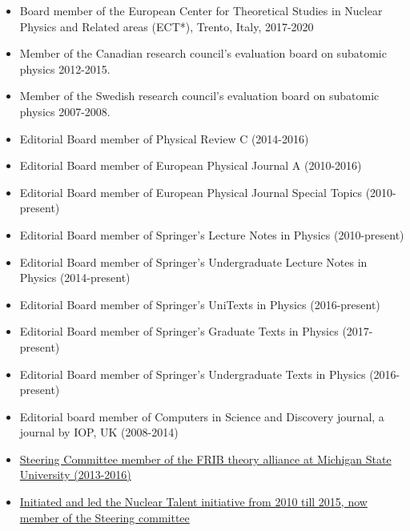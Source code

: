 \documentclass[11pt]{revtex4-1}
\begin{document}
\begin{itemize}

\item Board member of the European Center for Theoretical Studies in Nuclear Physics and Related areas (ECT*), Trento, Italy, 2017-2020


\item Member of the Canadian research council's evaluation board on subatomic physics 2012-2015.

\item Member of the Swedish research council's evaluation board on subatomic physics 2007-2008.

\item Editorial Board member of Physical Review C (2014-2016)

\item Editorial Board member of European Physical Journal A (2010-2016)

\item Editorial Board member of European Physical Journal Special Topics (2010-present)

\item Editorial Board member of Springer's Lecture Notes in Physics (2010-present)

\item Editorial Board member of Springer's Undergraduate Lecture Notes in Physics (2014-present)

\item Editorial Board member of Springer's UniTexts in Physics (2016-present)

\item Editorial Board member of Springer's Graduate Texts in Physics (2017-present)

\item Editorial Board member of Springer's Undergraduate Texts in Physics (2016-present)

\item Editorial board member of Computers in Science and Discovery journal, a journal by IOP, UK (2008-2014)

\item \href{{http://fribtheoryalliance.org/}}{Steering Committee member of the FRIB theory alliance at Michigan State University (2013-2016)}

\item \href{{http://www.nucleartalent.org/}}{Initiated and led the Nuclear Talent initiative from 2010 till 2015, now member of the Steering committee}



\end{itemize}
\end{document}
